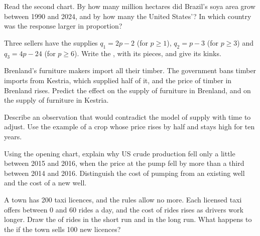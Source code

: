 \begin{exercise}[$\star\star$]\label{exo:g10:supply:9}
Read the second chart. By how many million hectares did Brazil's soya area grow between 1990 and 2024, and by how many the United States'?
In which country was the response larger in proportion?
\end{exercise}

\begin{exercise}[$\star\star$]\label{exo:g10:supply:10}
Three sellers have the supplies $q_1 = 2p - 2$ (for $p \ge 1$), $q_2 = p - 3$ (for $p \ge 3$) and $q_3 = 4p - 24$ (for $p \ge 6$). Write the
, with its pieces, and give its kinks.
\end{exercise}

\begin{exercise}[$\star\star$]\label{exo:g10:supply:11}
Brenland's furniture makers import all their timber. The government bans timber imports from Kestria, which supplied half of it, and the
price of timber in Brenland rises. Predict the effect on the supply of furniture in Brenland, and on the supply of furniture in Kestria.
\end{exercise}

\begin{exercise}[$\star\star\star$]\label{exo:g10:supply:12}
Describe an observation that would contradict the model of supply with time to adjust. Use the example of a crop whose price rises by half
and stays high for ten years.
\end{exercise}

\begin{exercise}[$\star\star\star$]\label{exo:g10:supply:13}
Using the opening chart, explain why US crude production fell only a little between 2015 and 2016, when the price at the pump fell by more
than a third between 2014 and 2016. Distinguish the cost of pumping from an existing well and the cost of a new well.
\end{exercise}

\begin{exercise}[$\star\star\star$]\label{exo:g10:supply:14}
A town has 200 taxi licences, and the rules allow no more. Each licensed taxi offers between 0 and 60 rides a day, and the cost of rides
rises as drivers work longer. Draw the  of rides in the short run and in the long run. What happens to the  if
the town sells 100 new licences?
\end{exercise}

